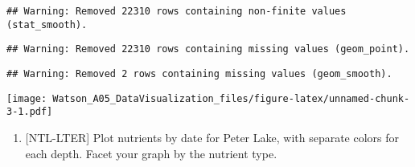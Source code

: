 \documentclass[]{article}
\newenvironment{Shaded}{\begin{snugshade}}{\end{snugshade}}
\newcommand{\KeywordTok}[1]{\textcolor[rgb]{0.13,0.29,0.53}{\textbf{#1}}}
\newcommand{\DataTypeTok}[1]{\textcolor[rgb]{0.13,0.29,0.53}{#1}}
\newcommand{\DecValTok}[1]{\textcolor[rgb]{0.00,0.00,0.81}{#1}}
\newcommand{\StringTok}[1]{\textcolor[rgb]{0.31,0.60,0.02}{#1}}
\newcommand{\CommentTok}[1]{\textcolor[rgb]{0.56,0.35,0.01}{\textit{#1}}}
\newcommand{\OperatorTok}[1]{\textcolor[rgb]{0.81,0.36,0.00}{\textbf{#1}}}
\newcommand{\NormalTok}[1]{#1}
\providecommand{\tightlist}{%
  \setlength{\itemsep}{0pt}\setlength{\parskip}{0pt}}
\begin{document}
\begin{Shaded}
\end{Shaded}

\begin{verbatim}
## Warning: Removed 22310 rows containing non-finite values (stat_smooth).
\end{verbatim}

\begin{verbatim}
## Warning: Removed 22310 rows containing missing values (geom_point).
\end{verbatim}

\begin{verbatim}
## Warning: Removed 2 rows containing missing values (geom_smooth).
\end{verbatim}

\texttt{[image: Watson\_A05\_DataVisualization\_files/figure-latex/unnamed-chunk-3-1.pdf]}

\begin{enumerate}
\def\labelenumi{\arabic{enumi}.}
\setcounter{enumi}{4}
\tightlist
\item
  {[}NTL-LTER{]} Plot nutrients by date for Peter Lake, with separate
  colors for each depth. Facet your graph by the nutrient type.
\end{enumerate}
\end{document}
